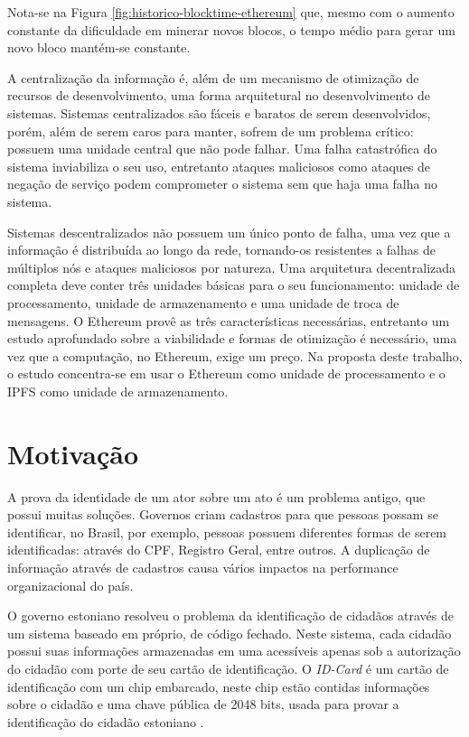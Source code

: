 \documentclass[tcc,capa]{texufpel}
\begin{document}
	Nota-se na Figura \ref{fig:historico-blocktime-ethereum} que, mesmo com o aumento constante da dificuldade em minerar novos blocos, o tempo médio para gerar um novo bloco mantém-se constante.
	
	A centralização da informação é, além de um mecanismo de otimização de recursos de desenvolvimento, uma forma arquitetural no desenvolvimento de sistemas. Sistemas centralizados são fáceis e baratos de serem desenvolvidos, porém, além de serem caros para manter, sofrem de um problema crítico: possuem uma unidade central que não pode falhar. Uma falha catastrófica do sistema inviabiliza o seu uso, entretanto ataques maliciosos como ataques de negação de serviço podem comprometer o sistema sem que haja uma falha no sistema.
	
    Sistemas descentralizados não possuem um único ponto de falha, uma vez que a informação é distribuída ao longo da rede, tornando-os resistentes a falhas de múltiplos nós e ataques maliciosos por natureza. Uma arquitetura decentralizada completa deve conter três unidades básicas para o seu funcionamento: unidade de processamento, unidade de armazenamento e uma unidade de troca de mensagens. O Ethereum provê as três características necessárias, entretanto um estudo aprofundado sobre a viabilidade e formas de otimização é necessário, uma vez que a computação, no Ethereum, exige um preço. Na proposta deste trabalho, o estudo concentra-se em usar o Ethereum como unidade de processamento e o IPFS como unidade de armazenamento.
	
\section{Motivação}\label{sc:motivacao}

    A prova da identidade de um ator sobre um ato é um problema antigo, que possui muitas soluções. Governos criam cadastros para que pessoas possam se identificar, no Brasil, por exemplo, pessoas possuem diferentes formas de serem identificadas: através do CPF, Registro Geral, entre outros. A duplicação de informação através de cadastros causa vários impactos na performance organizacional do país.
    
    O governo estoniano resolveu o problema da identificação de cidadãos através de um sistema baseado em \bchain próprio, de código fechado. Neste sistema, cada cidadão possui suas informações armazenadas em uma \bchain acessíveis apenas sob a autorização do cidadão com porte de seu cartão de identificação. O \textit{ID-Card} é um cartão de identificação com um chip embarcado, neste chip estão contidas informações sobre o cidadão e uma chave pública de 2048 bits, usada para provar a identificação do cidadão estoniano \cite{eidentity}.
    
\end{document}
